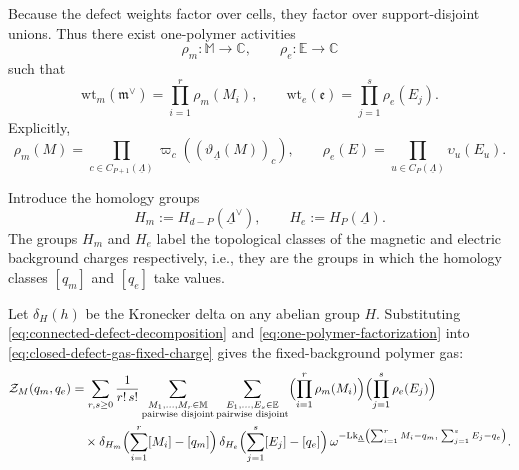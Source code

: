 \documentclass[dvipsnames,a4paper]{article}
\numberwithin{equation}{section}
\theoremstyle{definition}
\theoremstyle{remark}
\newcommand{\Lk}{\mathrm{Lk}}
\newcommand{\wt}{\mathrm{wt}}
\begin{document}
Because the defect weights factor over cells, they factor over support-disjoint unions.
Thus there exist one-polymer activities
\begin{equation}
	\rho_m:\mathbb M \to \mathbb C,
	\qquad
	\rho_e:\mathbb E \to \mathbb C
\end{equation}
such that
\begin{equation}
	\wt_m(\mathfrak m^\vee)=\prod_{i=1}^r \rho_m(M_i),
	\qquad
	\wt_e(\mathfrak e)=\prod_{j=1}^s \rho_e(E_j).
	\label{eq:one-polymer-factorization}
\end{equation}
Explicitly,
\begin{equation}
	\rho_m(M)
	=
	\prod_{c\in C_{P+1}(\underline\Lambda)}
	\varpi_c \left((\vartheta_{\underline\Lambda}(M))_c\right),
	\qquad
	\rho_e(E)
	=
	\prod_{u\in C_P(\underline\Lambda)}\upsilon_u(E_u).
	\label{eq:one-polymer-activities-fixed-charge}
\end{equation}

Introduce the homology groups
\begin{equation}
	H_m:=H_{d-P}(\underline\Lambda^\vee),
	\qquad
	H_e:=H_P(\underline\Lambda).
	\label{eq:fixed-charge-homology-groups}
\end{equation}
The groups $H_m$ and $H_e$ label the topological classes of the magnetic and electric background charges respectively, i.e., they are the groups in which the homology classes \([q_m]\) and \([q_e]\) take values.

Let $\delta_H(h)$ be the Kronecker delta on any abelian group $H$. Substituting \eqref{eq:connected-defect-decomposition} and
\eqref{eq:one-polymer-factorization} into
\eqref{eq:closed-defect-gas-fixed-charge} gives the fixed-background polymer gas:
\begin{equation}
\begin{aligned}
	\mathcal Z_M(q_m,q_e)
	&=
	\sum_{r,s\ge 0}
	\frac{1}{r!\,s!}
	\sum_{\substack{M_1,\dots,M_r\in \mathbb M \\
			\text{pairwise disjoint}}}
	\sum_{\substack{E_1,\dots,E_s\in \mathbb E \\
			\text{pairwise disjoint}}}
	\Bigl(\prod_{i=1}^r \rho_m(M_i)\Bigr)
	\Bigl(\prod_{j=1}^s \rho_e(E_j)\Bigr)
	\\
	&\quad\times
	\delta_{H_m} \Bigl(\sum_{i=1}^r [M_i]-[q_m]\Bigr)\,
	\delta_{H_e} \Bigl(\sum_{j=1}^s [E_j]-[q_e]\Bigr)\,
	\omega^{-
		\Lk_{\underline\Lambda}
		\left(
		\sum_{i=1}^r M_i-q_m,\;
		\sum_{j=1}^s E_j-q_e
		\right)
	}.
\end{aligned}
\label{eq:fixed-charge-polymer-gas}
\end{equation}
\end{document}
